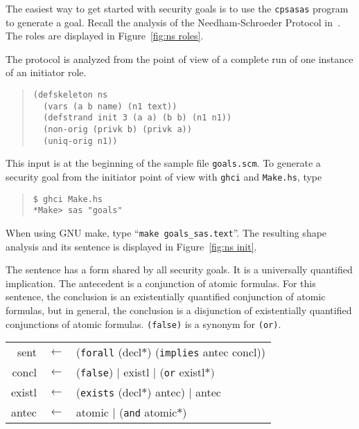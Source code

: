 \documentclass[12pt]{article}
\newcommand{\sym}[1]{\textup{\texttt{#1}}}
\begin{document}
The easiest way to get started with security goals is to use the
\texttt{cpsasas} program to generate a goal.  Recall the analysis of
the Needham-Schroeder Protocol in~\cite[Section~10]{cpsaprimer09}.
The roles are displayed in Figure~\ref{fig:ns roles}.

The protocol is analyzed from the point of view of a complete run of
one instance of an initiator role.

\begin{quote}
\begin{verbatim}
(defskeleton ns
  (vars (a b name) (n1 text))
  (defstrand init 3 (a a) (b b) (n1 n1))
  (non-orig (privk b) (privk a))
  (uniq-orig n1))
\end{verbatim}
\end{quote}

This {\cpsa} input is at the beginning of the sample file
\texttt{goals.scm}.  To generate a security goal from the initiator
point of view with \texttt{ghci} and \texttt{Make.hs}, type
\begin{quote}
\begin{verbatim}
$ ghci Make.hs
*Make> sas "goals"
\end{verbatim}
\end{quote}
When using GNU make, type ``\texttt{make goals\_sas.text}''.  The
resulting shape analysis and its sentence is displayed in
Figure~\ref{fig:ns init}.

The sentence has a form shared by all security goals.  It is a
universally quantified implication.  The antecedent is a conjunction
of atomic formulas.  For this sentence, the conclusion is an
existentially quantified conjunction of atomic formulas, but in
general, the conclusion is a disjunction of existentially quantified
conjunctions of atomic formulas.  \sym{(false)} is a synonym for
\sym{(or)}.

\begin{center}\scshape
  \begin{tabular}{rcl}
  sent&$\leftarrow$&(\sym{forall} (decl$\ast$) (\sym{implies} antec concl))
  \\ concl&$\leftarrow$&(\sym{false})
  $\mid$ existl $\mid$ (\sym{or} existl$\ast)$
  \\ existl&$\leftarrow$&(\sym{exists}
  (decl$\ast$) antec) $\mid$ antec
  \\ antec&$\leftarrow$&atomic $\mid$ (\sym{and} atomic$\ast$)
  \end{tabular}
\end{center}
\end{document}
